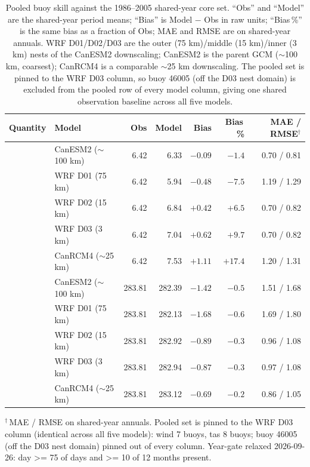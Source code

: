 \begin{table}[t]
\centering
\caption{Pooled buoy skill against the 1986--2005 shared-year core set.
``Obs'' and ``Model'' are the shared-year period means; ``Bias'' is
Model $-$ Obs in raw units; ``Bias\,\%'' is the same bias as a fraction
of Obs; MAE and RMSE are on shared-year annuals. WRF D01/D02/D03 are the
outer (75 km)/middle (15 km)/inner (3 km) nests of the CanESM2
downscaling; CanESM2 is the parent GCM ($\sim$100 km, coarsest); CanRCM4
is a comparable $\sim$25 km downscaling. The pooled set is pinned to
the WRF D03 column, so buoy 46005 (off the D03 nest domain) is excluded
from the pooled row of every model column, giving one shared observation
baseline across all five models.}
\begin{tabular}{llrrrrr}
\hline\hline
Quantity & Model & Obs & Model & Bias & Bias\,\% & MAE / RMSE$^{\dagger}$ \\
\hline
{}& CanESM2 ($\sim$100 km) & 6.42 & 6.33 & $-0.09$ & $-1.4$ & 0.70 / 0.81 \\
& WRF D01 (75 km) & 6.42 & 5.94 & $-0.48$ & $-7.5$ & 1.19 / 1.29 \\
& WRF D02 (15 km) & 6.42 & 6.84 & $+0.42$ & $+6.5$ & 0.70 / 0.82 \\
& WRF D03 (3 km) & 6.42 & 7.04 & $+0.62$ & $+9.7$ & 0.70 / 0.82 \\
& CanRCM4 ($\sim$25 km) & 6.42 & 7.53 & $+1.11$ & $+17.4$ & 1.20 / 1.31 \\
\hline
{}& CanESM2 ($\sim$100 km) & 283.81 & 282.39 & $-1.42$ & $-0.5$ & 1.51 / 1.68 \\
& WRF D01 (75 km) & 283.81 & 282.13 & $-1.68$ & $-0.6$ & 1.69 / 1.80 \\
& WRF D02 (15 km) & 283.81 & 282.92 & $-0.89$ & $-0.3$ & 0.96 / 1.08 \\
& WRF D03 (3 km) & 283.81 & 282.94 & $-0.87$ & $-0.3$ & 0.97 / 1.08 \\
& CanRCM4 ($\sim$25 km) & 283.81 & 283.12 & $-0.69$ & $-0.2$ & 0.86 / 1.05 \\
\hline
\end{tabular}
\begin{minipage}{0.96\textwidth}
\raggedright
\footnotesize
$^{\dagger}$\,MAE / RMSE on shared-year annuals. Pooled set is pinned to
the WRF D03 column (identical across all five models): wind 7 buoys,
tas 8 buoys; buoy 46005 (off the D03 nest domain) pinned out of every
column. Year-gate relaxed 2026-09-26: day >= 75%
of days and >= 10 of 12 months present.
\end{minipage}
\end{table}
